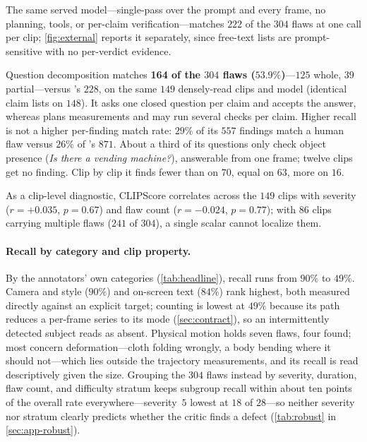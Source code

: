 The same served model---single-pass over the prompt and every frame, no planning, tools, or per-claim verification---matches $222$ of the $304$ flaws at one call per clip; \cref{fig:external} reports it separately, since free-text lists are prompt-sensitive with no per-verdict evidence.

Question decomposition matches \textbf{164 of the $304$ flaws ($53.9\%$)}---$125$ whole, $39$ partial---versus \PhyReAct{}'s $228$, on the same $149$ densely-read clips and model (identical claim lists on $148$). It asks one closed question per claim and accepts the answer, whereas \PhyReAct{} plans measurements and may run several checks per claim. Higher recall is not a higher per-finding match rate: $29\%$ of its $557$ findings match a human flaw versus $26\%$ of \PhyReAct{}'s $871$. About a third of its questions only check object presence (\emph{Is there a vending machine?}), answerable from one frame; twelve clips get no finding. Clip by clip it finds fewer than \PhyReAct{} on $70$, equal on $63$, more on $16$.

As a clip-level diagnostic, CLIPScore correlates across the $149$ clips with severity ($r=+0.035$, $p=0.67$) and flaw count ($r=-0.024$, $p=0.77$); with $86$ clips carrying multiple flaws ($241$ of $304$), a single scalar cannot localize them.
\paragraph{Recall by category and clip property.}\label{sec:bycat}

By the annotators' own categories (\cref{tab:headline}), recall runs from $90\%$ to $49\%$. Camera
and style ($90\%$) and on-screen text ($84\%$) rank highest, both measured directly against an
explicit target; counting is lowest at $49\%$ because its path reduces a per-frame series to its mode
(\cref{sec:contract}), so an intermittently detected subject reads as absent. Physical motion holds
seven flaws, four found; most concern deformation---cloth folding wrongly, a body bending where it
should not---which lies outside the trajectory measurements, and its recall is read descriptively
given the size. Grouping the $304$ flaws instead by severity, duration, flaw count, and difficulty
stratum keeps subgroup recall within about ten points of the overall rate everywhere---severity~$5$
lowest at $18$ of $28$---so neither severity nor stratum clearly predicts whether the critic finds a
defect (\cref{tab:robust} in \cref{sec:app-robust}).

